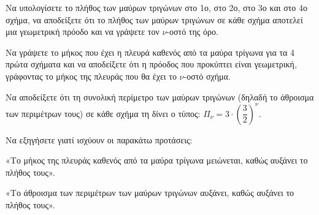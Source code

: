 \begin{alist}
\begin{center}

\end{center}

\end{alist}
\begin{alist}
\item Να υπολογίσετε το πλήθος των μαύρων τριγώνων στο 1ο, στο 2ο, στο 3ο και στο 4ο σχήμα, να αποδείξετε ότι το πλήθος των μαύρων τριγώνων σε κάθε σχήμα αποτελεί μια γεωμετρική πρόοδο και να γράψετε τον $\nu$-οστό της όρο.
\item Να γράψετε το μήκος που έχει η πλευρά καθενός από τα μαύρα τρίγωνα για τα 4 πρώτα σχήματα και να αποδείξετε ότι η πρόοδος που προκύπτει είναι γεωμετρική, γράφοντας το μήκος της πλευράς που θα έχει το $\nu$-οστό σχήμα.
\item Να αποδείξετε ότι τη συνολική περίμετρο των μαύρων τριγώνων (δηλαδή το άθροισμα των περιμέτρων τους) σε κάθε σχήμα τη δίνει ο τύπος: $\Pi_{\nu} = 3 \cdot \left(\dfrac{3}{2}\right)^{\nu}$.
\item Να εξηγήσετε γιατί ισχύουν οι παρακάτω προτάσεις:
\begin{rlist}
\item «Το μήκος της πλευράς καθενός από τα μαύρα τρίγωνα μειώνεται, καθώς αυξάνει το πλήθος τους».
\item «Το άθροισμα των περιμέτρων των μαύρων τριγώνων αυξάνει, καθώς αυξάνει το πλήθος τους».

\end{rlist}
\end{alist}













\newpage
{}
\newenvironment{bulletlist}{\begin{itemize}}{\end{itemize}}
\setcounter{askhsh}{0}

